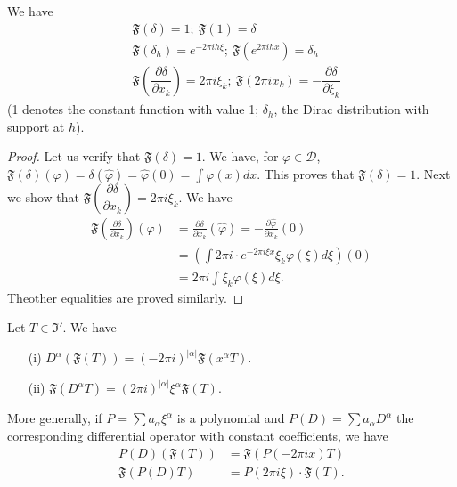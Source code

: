 \begin{proposition}\label{chap4-prop9}
We have
\begin{align*}
&\mathfrak{F}(\delta)=1; \ \mathfrak{F}(1)=\delta\\[4pt]
& \mathfrak{F}(\delta_{h})=e^{-2\pi ih\xi}; \ \mathfrak{F}(e^{2\pi
    ihx})=\delta_{h}\\[4pt]
& \mathfrak{F}\left(\dfrac{\partial \delta}{\partial
    x_{k}}\right)=2\pi i\xi_{k}; \ \mathfrak{F}(2\pi
  ix_{k})=-\dfrac{\partial \delta}{\partial \xi_{k}}
\end{align*}
(1 denotes the constant function with value 1; $\delta_{h}$, the Dirac
distribution with support at $h$).
\end{proposition}

\begin{proof}
Let us verify that $\mathfrak{F}(\delta)=1$. We have, for $\varphi\in
\mathcal{D}$,
$\mathfrak{F}(\delta)(\varphi)=\delta(\widehat{\varphi})=\widehat{\varphi}(0)=\int
\varphi(x)dx$. This proves that $\mathfrak{F}(\delta)=1$. Next we show
that $\mathfrak{F}\left(\dfrac{\partial \delta}{\partial
  x_{k}}\right)=2\pi i\xi_{k}$. We have
\begin{align*}
\mathfrak{F}\left(\frac{\partial \delta}{\partial
  x_{k}}\right)(\varphi)&= \frac{\partial \delta}{\partial
  x_{k}}(\widehat{\varphi})=-\frac{\partial
  \widehat{\varphi}}{\partial x_{k}}(0)\\[4pt]
&= \left(\int 2\pi i\cdot e^{-2\pi i\xi
  x}\xi_{k}\varphi(\xi)d\xi\right)(0)\\[3pt]
&= 2\pi i\int \xi_{k}\varphi(\xi)d\xi.
\end{align*}
The\pageoriginale other equalities are proved similarly.
\end{proof}

\begin{proposition}\label{chap4-prop10}
Let $T\in \mathfrak{I}'$. We have
\begin{itemize}
\item[\rm(i)] $D^{\alpha}(\mathfrak{F}(T))=(-2\pi
  i)^{|\alpha|}\mathfrak{F}(x^{\alpha}T)$.

\item[\rm(ii)] $\mathfrak{F}(D^{\alpha}T)=(2\pi i)^{|\alpha|}\xi^{\alpha}\mathfrak{F}(T)$.
\end{itemize}
More generally, if $P=\sum a_{\alpha}\xi^{\alpha}$ is a polynomial and
$P(D)=\sum a_{\alpha}D^{\alpha}$ the corresponding differential
operator with constant coefficients, we have
\begin{align*}
P(D)(\mathfrak{F}(T)) &=\mathfrak{F}(P(-2\pi ix)T)\\[3pt]
\mathfrak{F}(P(D)T) &= P(2\pi i\xi)\cdot \mathfrak{F}(T).
\end{align*}
\end{proposition}

